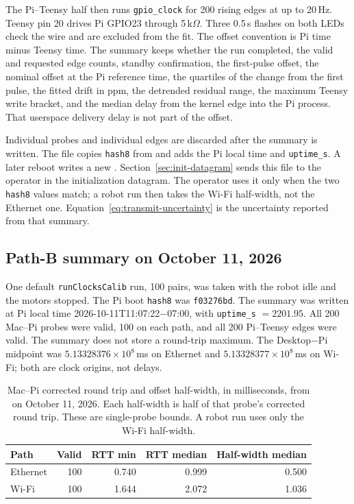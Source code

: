 The Pi--Teensy half then runs \texttt{gpio\_clock} for 200 rising edges at up to 20\,Hz. Teensy pin 20 drives Pi GPIO23 through 5\,k$\Omega$. Three 0.5\,s flashes on both LEDs check the wire and are excluded from the fit. The offset convention is Pi time minus Teensy time. The summary keeps whether the run completed, the valid and requested edge counts, standby confirmation, the first-pulse offset, the nominal offset at the Pi reference time, the quartiles of the change from the first pulse, the fitted drift in ppm, the detrended residual range, the maximum Teensy write bracket, and the median delay from the kernel edge into the Pi process. That userspace delivery delay is not part of the offset.

Individual probes and individual edges are discarded after the summary is written. The file copies \texttt{hash8} from  and adds the Pi local time and \texttt{uptime\_s}. A later reboot writes a new . Section~\ref{sec:init-datagram} sends this file to the operator in the initialization datagram. The operator uses it only when the two \texttt{hash8} values match; a robot run then takes the Wi-Fi half-width, not the Ethernet one. Equation~\eqref{eq:transmit-uncertainty} is the uncertainty reported from that summary.

\subsection{Path-B summary on October 11, 2026}
\label{sec:clock-delay-current}
One default \texttt{runClocksCalib} run, 100 pairs, was taken with the robot idle and the motors stopped. The Pi boot \texttt{hash8} was \texttt{f03276bd}. The summary was written at Pi local time 2026-10-11T11:07:22$-$07:00, with \texttt{uptime\_s} $=2201.95$. All 200 Mac--Pi probes were valid, 100 on each path, and all 200 Pi--Teensy edges were valid. The summary does not store a round-trip maximum. The Desktop$-$Pi midpoint was $5.13328376\times 10^{8}$\,ms on Ethernet and $5.13328377\times 10^{8}$\,ms on Wi-Fi; both are clock origins, not delays.

\begin{table}[H]
\centering
\caption{Mac--Pi corrected round trip and offset half-width, in milliseconds, from \protect{} on October 11, 2026. Each half-width is half of that probe's corrected round trip. These are single-probe bounds. A robot run uses only the Wi-Fi half-width.}
\label{tab:clock-delay-current}
\begin{tabular}{lrrrr}
\toprule
Path & Valid & RTT min & RTT median & Half-width median \\
\midrule
Ethernet & 100 & 0.740 & 0.999 & 0.500 \\
Wi-Fi & 100 & 1.644 & 2.072 & 1.036 \\
\bottomrule
\end{tabular}
\end{table}


